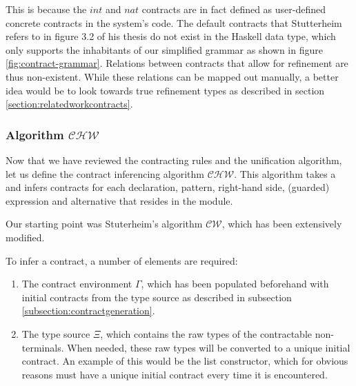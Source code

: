\documentclass[10pt]{report}
\newcommand{\CHW}{$\mathcal{CHW}$}
\newcommand{\code}[1]{%
  {%
   \setlength{\fboxsep}{-2\fboxrule}%
   \fcolorbox{black}{light-gray}{\hspace{1.5pt}\strut\texttt{#1}\hspace{1.5pt}}%
  }%
}
\begin{document}
This is because the $int$ and $nat$ contracts are in fact defined as user-defined concrete contracts in the system's code.
The default contracts that Stutterheim refers to in figure 3.2 of his thesis do not exist in the Haskell data type, which only supports the inhabitants of our simplified grammar as shown in figure \ref{fig:contract-grammar}.
Relations between contracts that allow for refinement are thus non-existent.
While these relations can be mapped out manually, a better idea would be to look towards true refinement types as described in section \ref{section:relatedworkcontracts}.


\subsubsection{Algorithm \CHW}
Now that we have reviewed the contracting rules and the unification algorithm, let us define the contract inferencing algorithm \CHW.
This algorithm takes a \code{Module} and infers contracts for each declaration, pattern, right-hand side, (guarded) expression and alternative that resides in the module.

Our starting point was Stuterheim's algorithm $\mathcal{CW}$, which has been extensively modified.

To infer a contract, a number of elements are required:
\begin{enumerate}
	\item The contract environment $\Gamma$, which has been populated beforehand with initial contracts from the type source as described in subsection \ref{subsection:contractgeneration}.
	\item The type source $\Xi$, which contains the raw types of the contractable non-terminals. When needed, these raw types will be converted to a unique initial contract. An example of this would be the list constructor, which for obvious reasons must have a unique initial contract every time it is encountered.
\end{enumerate}
\end{document}
